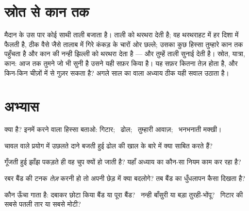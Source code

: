 \section{स्रोत से कान तक}

\begin{example}[एक ताली की यात्रा]\label{ex:g3:sound-around-us:journey}
मैदान के उस पार कोई साथी ताली बजाता है। ताली  को थरथरा देती है;
वह थरथराहट  में हर दिशा में फैलती है, ठीक वैसे जैसे तालाब में गिरे
कंकड़ के चारों ओर छल्ले; उसका कुछ हिस्सा तुम्हारे कान तक पहुँचता है
और कान की नन्ही झिल्ली को थरथरा देता है --- और तुम्हें ताली सुनाई देती
है। स्रोत, यात्रा, कान: आज तक तुमने जो भी  सुनी है उसने यही सफ़र
किया है। यह सफ़र कितना तेज़ होता है, और किन-किन चीज़ों में से गुज़र
सकता है? अगले साल का  वाला अध्याय ठीक यही सवाल उठाता है।
\end{example}

\section{अभ्यास}

\begin{exercise}[$\star$]\label{exo:g3:sound-around-us:1}
 क्या है? इनमें  करने वाला हिस्सा बताओ: गिटार; \ ढोल; \
तुम्हारी आवाज़; \ भनभनाती मक्खी।
\end{exercise}

\begin{exercise}[$\star$]\label{exo:g3:sound-around-us:2}
चावल वाले प्रयोग में उछलते दाने बजती हुई ढोल की खाल के बारे में क्या
साबित करते हैं?
\end{exercise}

\begin{exercise}[$\star$]\label{exo:g3:sound-around-us:3}
गूँजती हुई झाँझ पकड़ते ही वह चुप क्यों हो जाती है? यहाँ अध्याय का
कौन-सा नियम काम कर रहा है?
\end{exercise}

\begin{exercise}[$\star$]\label{exo:g3:sound-around-us:4}
रबर बैंड की टनक \emph{तेज़} करनी हो तो अपनी छेड़ में क्या बदलोगे? तब
बैंड का धुँधलापन कैसा दिखता है?
\end{exercise}

\begin{exercise}[$\star$]\label{exo:g3:sound-around-us:5}
कौन ऊँचा गाता है: दबाकर छोटा किया बैंड या पूरा बैंड? \ नन्ही
बाँसुरी या बड़ा तुरही-भोंपू? \ गिटार की सबसे पतली तार या सबसे मोटी?
\end{exercise}

